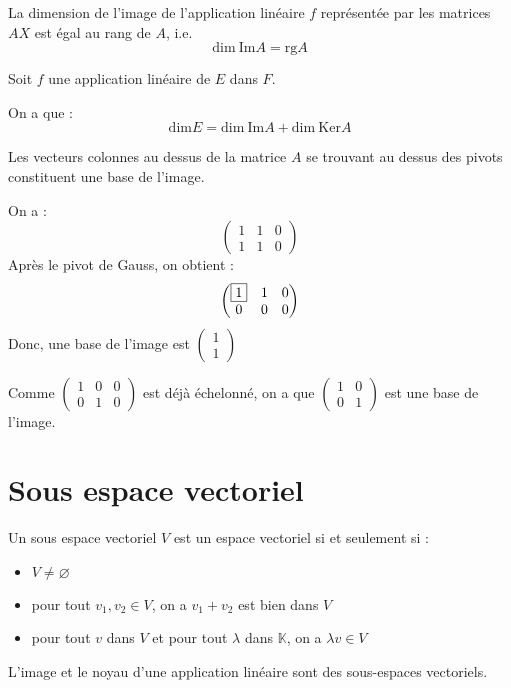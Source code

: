 \documentclass[a4paper, titlepage]{article}
\begin{document}
	\begin{thm}
		La dimension de l'image de l'application linéaire $f$ représentée par les matrices $AX$ est égal au rang de $A$, i.e.
		$$ \mathrm{dim}~\mathrm{Im}A = \mathrm{rg}A $$
	\end{thm}
	\begin{thm}
		Soit $f$ une application linéaire de $E$ dans $F$.

		On a que :
		$$ \mathrm{dim}E = \mathrm{dim}~\mathrm{Im}A+\mathrm{dim}~\mathrm{Ker}A $$
	\end{thm}
	\begin{thm}
		Les vecteurs colonnes au dessus de la matrice $A$ se trouvant au dessus des pivots constituent une base de l'image.
	\end{thm}
	\begin{exemple}
		On a :
		$$ \begin{pmatrix} 1&1&0\\1&1&0 \end{pmatrix} $$
		Après le pivot de Gauss, on obtient :
		$$ \begin{pmatrix} \fbox{1}&1&0\\0&0&0 \end{pmatrix} $$
		Donc, une base de l'image est $\begin{pmatrix} 1\\1 \end{pmatrix} $

		Comme $\begin{pmatrix} 1&0&0\\0&1&0 \end{pmatrix}$ est déjà échelonné, on a que $\begin{pmatrix} 1&0\\0&1 \end{pmatrix}$ est une base de l'image.
	\end{exemple}
	\section{Sous espace vectoriel}
	\begin{defn}
		Un sous espace vectoriel $V$ est un espace vectoriel si et seulement si :
		\begin{itemize}
			\item $V\neq \varnothing$
			\item pour tout $v_1,v_2\in V$, on a $v_1+v_2$ est bien dans $V$
			\item pour tout $v$ dans $V$ et pour tout $\lambda$ dans $\mathbb{K}$, on a $\lambda v\in V$
		\end{itemize}
	\end{defn}
	\begin{props}
		L'image et le noyau d'une application linéaire sont des sous-espaces vectoriels.
	\end{props}
\end{document}
